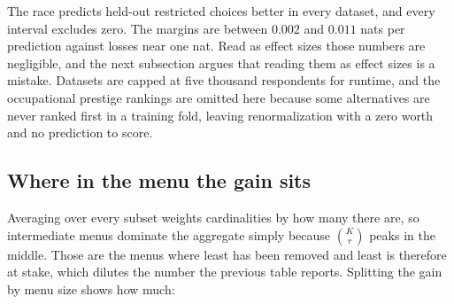 \documentclass[11pt]{article}
\begin{document}
The race predicts held-out restricted choices better in every dataset, and every
interval excludes zero. The margins are between $0.002$ and $0.011$ nats per
prediction against losses near one nat. Read as effect sizes those numbers are
negligible, and the next subsection argues that reading them as effect sizes is a
mistake. Datasets are capped at five thousand respondents for runtime, and the
occupational prestige rankings are omitted here because some alternatives are never
ranked first in a training fold, leaving renormalization with a zero worth and no
prediction to score.

\subsection{Where in the menu the gain sits}

Averaging over every subset weights cardinalities by how many there are, so
intermediate menus dominate the aggregate simply because $\binom{K}{r}$ peaks in the
middle. Those are the menus where least has been removed and least is therefore at
stake, which dilutes the number the previous table reports. Splitting the gain by
menu size shows how much:
\end{document}
